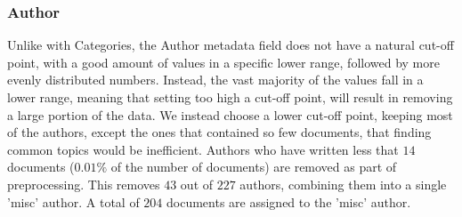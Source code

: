 \subsubsection{Author}\label{subsec:appendix_author}
Unlike with Categories, the Author metadata field does not have a natural cut-off point, with a good amount of values in a specific lower range, followed by more evenly distributed numbers.
Instead, the vast majority of the values fall in a lower range, meaning that setting too high a cut-off point, will result in removing a large portion of the data.
We instead choose a lower cut-off point, keeping most of the authors, except the ones that contained so few documents, that finding common topics would be inefficient.
Authors who have written less that $14$ documents ($0.01\%$ of the number of documents) are removed as part of preprocessing.
This removes $43$ out of $227$ authors, combining them into a single 'misc' author.
A total of $204$ documents are assigned to the 'misc' author.

